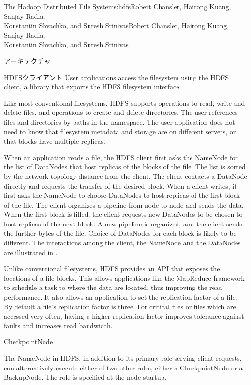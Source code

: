 \begin{aosachaptertoc}{The Hadoop Distributed File System}{s:hdfs}{Robert Chansler, Hairong Kuang, Sanjay Radia, \\ Konstantin Shvachko, and Suresh Srinivas}{Robert Chansler, Hairong Kuang, Sanjay Radia, \\ \hspace*{0.9cm} Konstantin Shvachko, and Suresh Srinivas}
\begin{aosasect1}{アーキテクチャ}
\begin{aosasect2}{HDFSクライアント}
User applications access the filesystem using the HDFS client, a
library that exports the HDFS filesystem interface.

Like most conventional filesystems, HDFS supports operations to read,
write and delete files, and operations to create and delete
directories. The user references files and directories by paths in the
namespace. The user application does not need to know that filesystem
metadata and storage are on different servers, or that blocks have
multiple replicas.

When an application reads a file, the HDFS client first asks the
NameNode for the list of DataNodes that host replicas of the blocks of
the file. The list is sorted by the network topology distance from the client. The client
contacts a DataNode directly and requests the
transfer of the desired block. When a client writes, it first asks the
NameNode to choose DataNodes to host replicas of the first block of
the file. The client organizes a pipeline from node-to-node and sends
the data. When the first block is filled, the client requests new
DataNodes to be chosen to host replicas of the next block. A new
pipeline is organized, and the client sends the further bytes of the
file. Choice of DataNodes for each block is likely to be
different. The interactions among the client, the NameNode and the
DataNodes are illustrated in .


Unlike conventional filesystems, HDFS provides an API that exposes
the locations of a file blocks.  This allows applications like the
MapReduce framework to schedule a task to where the data are located,
thus improving the read performance. It also allows an application to
set the replication factor of a file. By default a file's replication
factor is three. For critical files or files which are accessed very
often, having a higher replication factor improves tolerance against
faults and increases read bandwidth.

\end{aosasect2}

\begin{aosasect2}{CheckpointNode}

The NameNode in HDFS, in addition to its primary role serving client
requests, can alternatively execute either of two other roles, either
a CheckpointNode or a BackupNode. The role is specified at the node
startup.


\end{aosasect2}
\end{aosasect1}
\end{aosachaptertoc}
